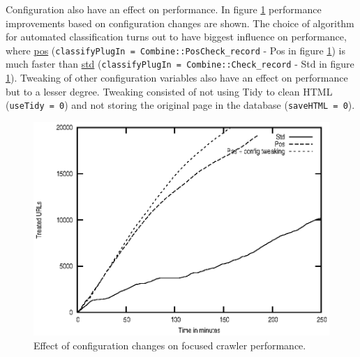 Configuration also have an effect on performance. In figure
\ref{config} performance improvements based on configuration changes are shown. The choice of
algorithm for automated classification turns out to have biggest
influence on performance, where \hyperref{algorithm 2}{algorithm 2 - section }{ -}{pos} ({\tt classifyPlugIn = Combine::PosCheck\_record} - Pos in figure \ref{config}) is much
faster than \hyperref{algorithm 1}{algorithm 1 - section }{ -}{std} ({\tt classifyPlugIn = Combine::Check\_record} - Std in figure \ref{config}). Tweaking of other configuration variables also have an effect
on performance but to a lesser degree. Tweaking consisted of not using
Tidy to clean HTML ({\tt useTidy = 0}) and not storing the original
page in the database ({\tt saveHTML = 0}).


\begin{figure}[htb]
\begin{center}
 \includegraphics[height=0.4\textheight]{Config.ps}
\end{center}
\caption{Effect of configuration changes on focused crawler performance.}
\label{config}
\end{figure}



